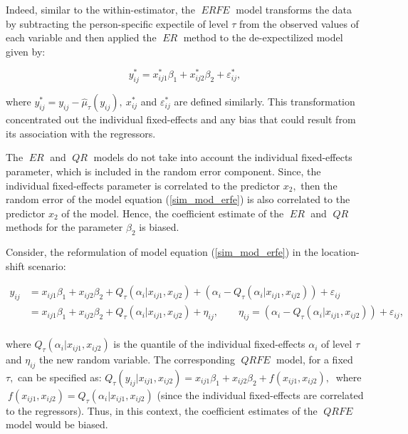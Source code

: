 \documentclass[15pt,a4paper]{article}
\DeclareMathOperator{\ERFE}{\textit{ERFE}}
\DeclareMathOperator{\QRFE}{\textit{QRFE}}
\DeclareMathOperator{\ER}{\textit{ER}}
\DeclareMathOperator{\QR}{\textit{QR}}
\begin{document}
Indeed, similar to the within-estimator, the $\ERFE$ model transforms the data by subtracting the person-specific expectile of level $\tau$ from the observed values of each variable and then applied the $\ER$ method to the de-expectilized model given by:

\begin{equation}\label{eq:de_expect}
y_{ij}^{*} = x_{ij1}^{*}\beta_1 + x_{ij2}^{*}\beta_2 + \varepsilon_{ij}^{*}, 
\end{equation}

where $y_{ij}^{*} = y_{ij} - \widehat{\mu}_{\tau}(y_{ij}), \ x_{ij}^{*}$ and $\varepsilon_{ij}^{*}$ are defined similarly. This transformation concentrated out the individual fixed-effects and any bias that could result from its association with the regressors.

The $\ER$ and $\QR$ models do not take into account the individual fixed-effects parameter, which is included in the random error component. Since, the individual fixed-effects parameter is correlated to the predictor $x_2,$ then the random error of the model equation (\ref{sim_mod_erfe}) is also correlated to the predictor $x_2$ of the model. Hence, the coefficient estimate of the $\ER$ and $\QR$ methods for the parameter $\beta_2$ is biased.

Consider, the reformulation of model equation (\ref{sim_mod_erfe}) in the location-shift scenario: 

\begin{equation*}
    \begin{split}
        y_{ij} & = x_{ij1}\beta_1 + x_{ij2}\beta_2 + Q_{\tau}(\alpha_i| x_{ij1}, x_{ij2}) + (\alpha_i - Q_{\tau}(\alpha_i| x_{ij1}, x_{ij2})) +
        \varepsilon_{ij} \\
               & = x_{ij1}\beta_1 + x_{ij2}\beta_2 + Q_{\tau}(\alpha_i| x_{ij1}, x_{ij2}) + \eta_{ij}, \qquad \eta_{ij} = (\alpha_i - Q_{\tau}(\alpha_i| x_{ij1}, x_{ij2}) ) + \varepsilon_{ij}, \\
    \end{split}
\end{equation*}

where $Q_{\tau}(\alpha_i| x_{ij1}, x_{ij2})$ is the quantile of the individual fixed-effects $\alpha_i$ of level $\tau$  and $\eta_{ij}$ the new random variable. The corresponding $\QRFE$ model, for a fixed $\tau,$ can be specified as: $ Q_{\tau}(y_{ij}| x_{ij1}, x_{ij2})=x_{ij1}\beta_1 + x_{ij2}\beta_2 + f(x_{ij1}, x_{ij2}), \ $ where $ \ f(x_{ij1}, x_{ij2})=Q_{\tau}(\alpha_i| x_{ij1}, x_{ij2})$ (since the individual fixed-effects are correlated to the regressors). Thus, in this context, the coefficient estimates of the $\QRFE$ model would be biased.  
\end{document}

